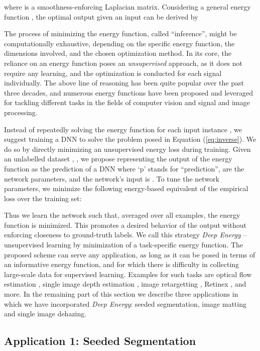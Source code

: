 \documentclass[journal]{IEEEtran}
\begin{document}
where  is a smoothness-enforcing Laplacian matrix. Considering a general energy function , the optimal output given an input  can be derived by

The process of minimizing the energy function, called ``inference'', might be computationally exhaustive, depending on the specific energy function, the dimensions involved, and the chosen optimization method. In its core, the reliance on an energy function poses an \textit{unsupervised} approach, as it does not require any learning, and the optimization is conducted for each signal  individually. The above line of reasoning has been quite popular over the past three decades, and numerous energy functions have been proposed and leveraged for tackling different tasks in the fields of computer vision and signal and image processing.  

Instead of repeatedly solving the energy function for each input instance , we suggest training a DNN to solve the problem posed in Equation (\ref{eq:inverse}). We do so by directly minimizing an unsupervised energy loss during training. Given an unlabelled dataset , , we propose representing the output of the energy function as the prediction of a DNN  where `p' stands for ``prediction'',  are the network parameters, and the network's input is . To tune the network parameters, we minimize the following energy-based equivalent of the empirical loss over the training set:

Thus we learn the network such that, averaged over all examples, the energy function is minimized. This promotes a desired behavior of the output without enforcing closeness to ground-truth labels. We call this strategy \emph{Deep Energy} -- unsupervised learning by minimization of a task-specific energy function. 
The proposed scheme can serve any application, as long as it can be posed in terms of an informative energy function, and for which there is difficulty in collecting large-scale data for supervised learning. Examples for such tasks are optical flow estimation \cite{optical_flow}, single image depth estimation \cite{depth_estimate}, image retargetting \cite{retargetting}, Retinex \cite{retinex}, and more. In the remaining part of this section we describe three applications in which we have incorporated \emph{Deep Energy}: seeded segmentation, image matting and single image dehazing.



\subsection{Application 1: Seeded Segmentation} \label{ss:segmentation}
\end{document}
